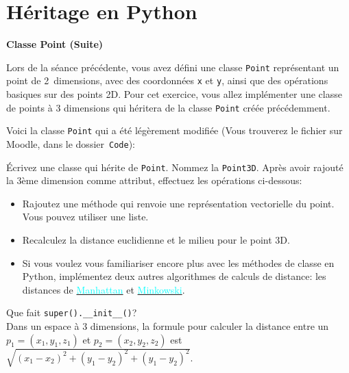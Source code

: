 \section{Héritage en Python }
\begin{Exercice}[15 minutes]\textbf{Classe Point (Suite)}

Lors de la séance précédente, vous avez défini une classe \lstinline{Point} représentant un point de 2~dimensions, avec des coordonnées \lstinline{x} et \lstinline{y}, ainsi que des opérations basiques sur des points 2D. Pour cet exercice, vous allez implémenter une classe de points à 3 dimensions qui héritera de la classe \lstinline{Point} créée précédemment. 


Voici la classe \lstinline{Point} qui a été légèrement modifiée (Vous trouverez le fichier sur Moodle, dans le dossier~\lstinline{Code}):
 

Écrivez une classe qui hérite de \lstinline{Point}. Nommez la \lstinline{Point3D}. Après avoir rajouté la 3ème dimension comme attribut, effectuez les opérations ci-dessous:

\begin{itemize}
	\item Rajoutez une méthode qui renvoie une représentation vectorielle du point. Vous pouvez utiliser une liste.
	\item Recalculez la distance euclidienne et le milieu pour le point 3D.
	\item \advanced Si vous voulez vous familiariser encore plus avec les méthodes de classe en Python, implémentez deux autres algorithmes de calculs de distance: les distances de \href{https://fr.wikipedia.org/wiki/Distance_de_Manhattan}{\textcolor{cyan}{Manhattan}} et \href{https://en.wikipedia.org/wiki/Minkowski_distance}{\textcolor{cyan}{Minkowski}}.
\end{itemize}
 

\begin{conseil}

Que fait \lstinline{super().__init__()}?\\
Dans un espace à 3 dimensions, la formule pour calculer la distance entre un $p_1 = (x_1, y_1, z_1)$ et $p_2 = (x_2, y_2, z_2)$ est $\sqrt{(x_1 - x_2)^2 + (y_1 - y_2)^2 + (y_1 - y_2)^2}$.
\end{conseil}
\begin{solution}
 
\end{solution}
\end{Exercice} 

